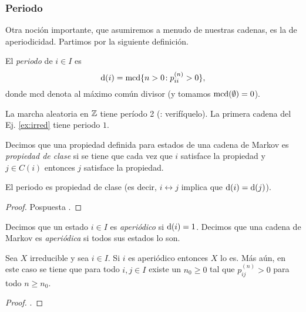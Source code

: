 \subsubsection{Periodo}

Otra noción importante, que asumiremos a menudo de nuestras cadenas, es la de aperiodicidad.
Partimos por la siguiente definición.

\begin{defn}
El \emph{periodo} de $i\in I$ es
\[\mathrm{d}(i)=\text{\upshape{mcd}}\{n>0\!:p^{(n)}_{ii}>0\},\]
donde mcd denota al máximo común divisor (y tomamos $\text{\upshape{mcd}}(\emptyset)=0$).
\end{defn}

\begin{ex}
La marcha aleatoria en $\mathbb{Z}$ tiene período 2 (\uexers: verifíquelo).
La primera cadena del Ej. \ref{ex:irred} tiene periodo $1$.
\end{ex}

\begin{defn}
Decimos que una propiedad definida para estados de una cadena de Markov es \emph{propiedad de clase} si se tiene que cada vez que $i$ satisface la propiedad y $j\in C(i)$ entonces $j$ satisface la propiedad.
\end{defn}

\begin{prop}
El periodo es propiedad de clase (es decir, $i\leftrightarrow j$ implica que $\mathrm{d}(i)=\mathrm{d}(j)$).
\end{prop}

\begin{proof}
Pospuesta \ucmark.
\end{proof}

\begin{defn}
Decimos que un estado $i\in I$ es \emph{aperiódico} si $\mathrm{d}(i)=1$.
Decimos que una cadena de Markov es \emph{aperiódica} si todos sus estados lo son.
\end{defn}

\begin{lem}
Sea $X$ irreducible y sea $i\in I$.
Si $i$ es aperiódico entonces $X$ lo es.
Más aún, en este caso se tiene que para todo $i,j\in I$ existe un $n_0\geq0$ tal que $p_{ij}^{(n)}>0$ para todo $n\geq n_0$.
\end{lem}

\begin{proof}
\uexer.
\end{proof}